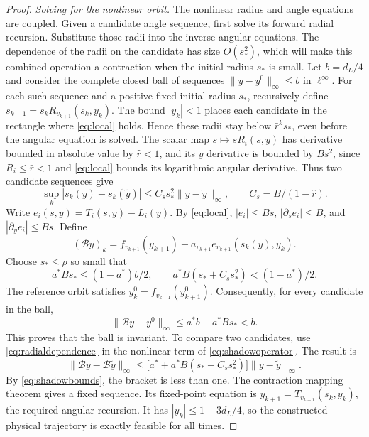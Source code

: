 \documentclass[11pt]{amsart}
\theoremstyle{definition}
\theoremstyle{remark}
\numberwithin{equation}{section}
\begin{document}
\begin{proof}
\smallskip
\emph{Solving for the nonlinear orbit.}
The nonlinear radius and angle equations are coupled. Given a
candidate angle sequence, first solve its forward radial recursion.
Substitute those radii into the inverse angular equations. The
dependence of the radii on the candidate has size $O(s_*^2)$,
which will make this combined operation a contraction when the
initial radius $s_*$ is small.
Let \(b=d_L/4\) and consider the complete closed ball of sequences
\(\|y-y^0\|_\infty\le b\) in \(\ell^\infty\).
For each such sequence and a positive fixed initial radius \(s_*\),
recursively define \(s_{k+1}=s_kR_{v_{k+1}}(s_k,y_k)\).
The bound $|y_k|<1$ places each candidate in the rectangle where
\eqref{eq:local} holds. Hence these radii stay below
$\bar r^ks_*$, even before the angular equation is solved.
The scalar map \(s\mapsto sR_i(s,y)\) has derivative bounded in
absolute value by \(\widehat r<1\), and its \(y\) derivative is
bounded by \(B s^2\), since \(R_i\le\bar r<1\) and \eqref{eq:local} bounds
its logarithmic angular derivative. Thus two candidate sequences give
\begin{equation}
\sup_k|s_k(y)-s_k(\widetilde y)|
       \le C_s s_*^2\|y-\widetilde y\|_\infty,
       \qquad C_s=B/(1-\widehat r).                         \label{eq:radialdependence}
\end{equation}
Write \(e_i(s,y)=T_i(s,y)-L_i(y)\). By \eqref{eq:local},
\(|e_i|\le Bs\), \(|\partial_s e_i|\le B\), and
\(|\partial_y e_i|\le Bs\). Define
\begin{equation}
(\mathcal By)_k=f_{v_{k+1}}(y_{k+1})
         -a_{v_{k+1}}e_{v_{k+1}}(s_k(y),y_k).               \label{eq:shadowoperator}
\end{equation}
Choose \(s_*\le\rho\) so small that
\begin{equation}
a^*Bs_*\le(1-a^*)b/2,
 \qquad a^*B(s_*+C_s s_*^2)<(1-a^*)/2.                     \label{eq:shadowbounds}
\end{equation}
The reference orbit satisfies $y_k^0=f_{v_{k+1}}(y_{k+1}^0)$.
Consequently, for every candidate in the ball,
\[
\|\mathcal By-y^0\|_\infty\le a^*b+a^*Bs_*<b.
\]
This proves that the ball is invariant. To compare two candidates,
use \eqref{eq:radialdependence} in the nonlinear term of
\eqref{eq:shadowoperator}. The result is
\[
\|\mathcal By-\mathcal B\widetilde y\|_\infty
\le\bigl[a^*+a^*B(s_*+C_s s_*^2)\bigr]
                                      \|y-\widetilde y\|_\infty.
\]
By \eqref{eq:shadowbounds}, the bracket is less than one.
The contraction mapping theorem gives a fixed sequence. Its fixed-point
equation is \(y_{k+1}=T_{v_{k+1}}(s_k,y_k)\), the required angular
recursion. It has \(|y_k|\le1-3d_L/4\), so the constructed
physical trajectory is exactly feasible for all times.


\end{proof}
\end{document}
